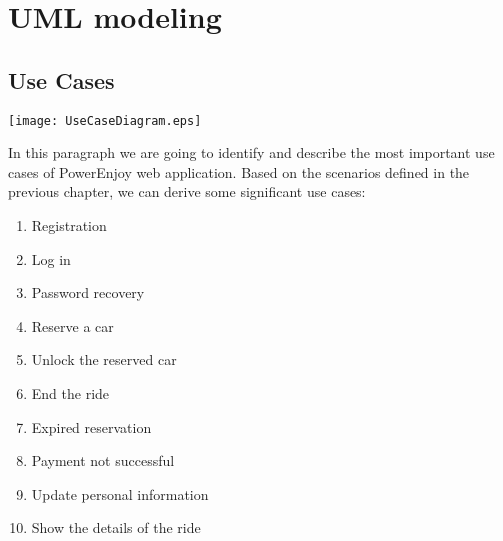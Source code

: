 \pagebreak
\section{UML modeling}
\subsection{Use Cases}
\centerline{
	\vspace{0.2in}
		\texttt{[image: UseCaseDiagram.eps]}}


In this paragraph we are going to identify and describe the most important use cases of PowerEnjoy web application.
Based on the scenarios defined in the previous chapter, we can derive some significant use cases:
\begin{enumerate}
	\item Registration
	\item Log in
	\item Password recovery
	\item Reserve a car
	\item Unlock the reserved car
	\item End the ride
	\item Expired reservation
	\item Payment not successful
	\item Update personal information
	\item Show the details of the ride
\end{enumerate}

\newtoggle{exception}
\newenvironment{UseCase}[5]{
	\paragraph{Partecipating actors:} #1
	\paragraph{Entry condition:} #2
	\paragraph{Flow of events:}
	\begin{itemize} 
		#3 
	\end{itemize}
	\paragraph{Exit condition:} #4
	\iftoggle{exception}{
		\paragraph{Exceptions:}
		\begin{itemize}
			#5
		\end{itemize}
	}{
	}
}{}

